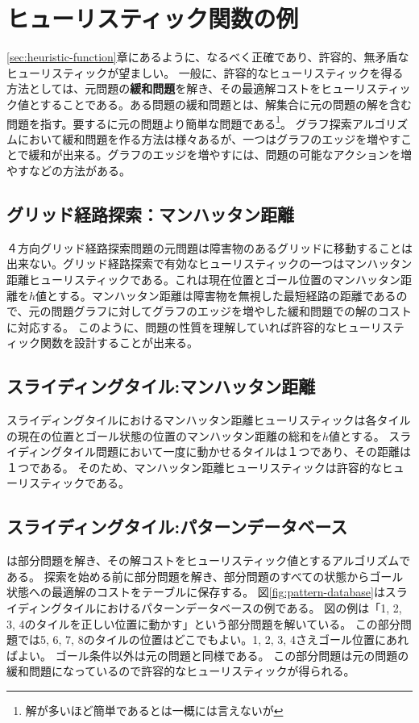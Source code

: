 \section{ヒューリスティック関数の例}
\label{sec:heuristic-example}

\ref{sec:heuristic-function}章にあるように、なるべく正確であり、許容的、無矛盾なヒューリスティックが望ましい。
一般に、許容的なヒューリスティックを得る方法としては、元問題の{\bf 緩和問題}を解き、その最適解コストをヒューリスティック値とすることである。ある問題の緩和問題とは、解集合に元の問題の解を含む問題を指す。要するに元の問題より簡単な問題である\footnote{解が多いほど簡単であるとは一概には言えないが}。
グラフ探索アルゴリズムにおいて緩和問題を作る方法は様々あるが、一つはグラフのエッジを増やすことで緩和が出来る。グラフのエッジを増やすには、問題の可能なアクションを増やすなどの方法がある。

\subsection{グリッド経路探索：マンハッタン距離}

４方向グリッド経路探索問題の元問題は障害物のあるグリッドに移動することは出来ない。グリッド経路探索で有効なヒューリスティックの一つはマンハッタン距離ヒューリスティックである。これは現在位置とゴール位置のマンハッタン距離を$h$値とする。マンハッタン距離は障害物を無視した最短経路の距離であるので、元の問題グラフに対してグラフのエッジを増やした緩和問題での解のコストに対応する。
このように、問題の性質を理解していれば許容的なヒューリスティック関数を設計することが出来る。


\subsection{スライディングタイル:マンハッタン距離}
スライディングタイルにおけるマンハッタン距離ヒューリスティックは各タイルの現在の位置とゴール状態の位置のマンハッタン距離の総和を$h$値とする。
スライディングタイル問題において一度に動かせるタイルは１つであり、その距離は１つである。
そのため、マンハッタン距離ヒューリスティックは許容的なヒューリスティックである。

\subsection{スライディングタイル:パターンデータベース}

は部分問題を解き、その解コストをヒューリスティック値とするアルゴリズムである\cite{edelkamp2001planning}。
探索を始める前に部分問題を解き、部分問題のすべての状態からゴール状態への最適解のコストをテーブルに保存する。
図\ref{fig:pattern-database}はスライディングタイルにおけるパターンデータベースの例である。
図の例は「1, 2, 3, 4のタイルを正しい位置に動かす」という部分問題を解いている。
この部分問題では5, 6, 7, 8のタイルの位置はどこでもよい。1, 2, 3, 4さえゴール位置にあればよい。
ゴール条件以外は元の問題と同様である。
この部分問題は元の問題の緩和問題になっているので許容的なヒューリスティックが得られる。

